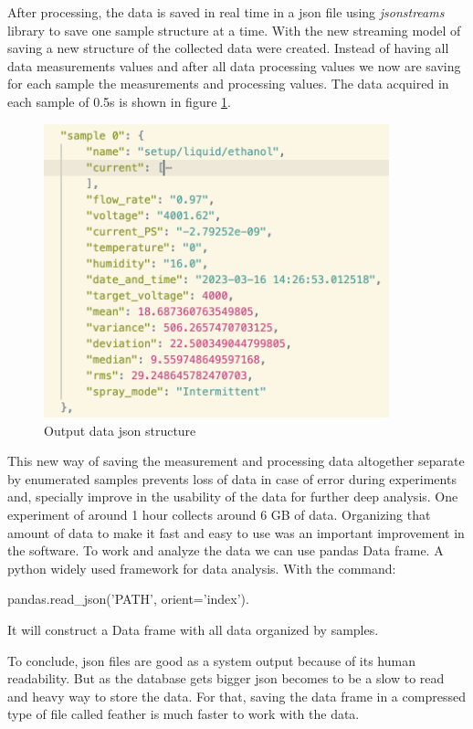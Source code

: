         After processing, the data is saved in real time in a json file using \emph{jsonstreams} library to save one sample structure at a time.
        With the new streaming model of saving a new structure of the collected data were created.
        Instead of having all data measurements values and after all data processing values we now are saving for each sample the measurements and processing values.
        The data acquired in each sample of 0.5s is shown in figure \ref{fig:data_sample}.
    
        \begin{figure}[H]
            \center
            \includegraphics[width=10cm]{Figuras/19:03/new_sample.png}
            \caption{Output data json structure}
            \label{fig:data_sample}
        \end{figure}
    
        This new way of saving the measurement and processing data altogether separate by enumerated samples prevents loss of data in case of error during experiments and, specially improve in the usability of the data for further deep analysis. One experiment of around 1 hour collects around 6 GB of data. Organizing that amount of data to make it fast and easy to use was an important improvement in the software.
        To work and analyze the data we can use  pandas Data frame. A python widely used framework for data analysis.
        With the command:
        
        pandas.read\_json('PATH', orient='index').

        It will construct a Data frame with all data organized by samples.
    
        To conclude, json files are good as a system output because of its human readability. But as the database gets bigger json becomes to be a slow to read and heavy way to store the data. For that, saving the data frame in a compressed type of file called feather is much faster to work with the data.
    
